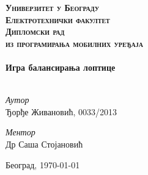 

\begin{titlepage}

\begin{center}



\textsc{\Huge \textbf{Универзитет у Београду}} \\[1cm]
\textsc{\Huge \textbf{Електротехнички факултет}}\\[5cm]

\textsc{\Huge \textbf{Дипломски рад }}\\[0.5cm]
\textsc{\large{\textbf{из програмирања мобилних уређаја}}}
\\[4cm]

\HRule \\[0.8cm]
{ \Huge \bfseries Игра балансирања лоптице}\\[0.5cm]

\HRule \\[4cm]

\begin{minipage}{0.55\textwidth}
\begin{flushleft} \large
\emph{Аутор}\\
Ђорђе Живановић, 0033/2013\\
\end{flushleft}
\end{minipage}
\begin{minipage}{0.4\textwidth}
\begin{flushright} \large
\emph{Ментор} \\
Др Саша Стојановић
\end{flushright}
\end{minipage}



\vfill

{\large Београд, \today}

\end{center}

\end{titlepage}